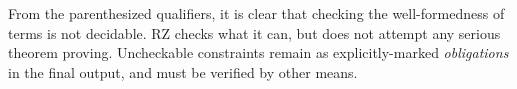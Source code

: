 From the parenthesized qualifiers, it is clear that checking the
well-formedness of terms is not decidable. RZ checks what it can, but does not
attempt any serious theorem proving. Uncheckable constraints remain as
explicitly-marked \emph{obligations} in the final output, and must be verified
by other means.






\newcommand{\ip}{p}
\newcommand{\ix}{x}
\newcommand{\is}{s}
\newcommand{\ie}{e}
\newcommand{\iP}{P}
\newcommand{\iS}{S}
\newcommand{\iprop}{\mathtt{prop}}
\newcommand{\itrue}{\mathtt{true}}
\newcommand{\ifalse}{\mathtt{false}}
\newcommand{\inot}[1]{\mathtt{not}\,#1}
\newcommand{\iimply}[2]{#1\,\mbox{\texttt{->}}\,#2}
\newcommand{\iiff}[2]{#1\,\mbox{\texttt{<->}}\,#2}
\newcommand{\iequal}[2]{#1\,\mathtt{=}\,#2}
\newcommand{\iands}[2]{#1\,\mathtt{/\backslash}\, #2}
\newcommand{\iors}[2]{#1\,\mathtt{\backslash/}\,#2}
\newcommand{\iforall}[3]{\texttt{forall}\,#1\,\texttt{:}\,#2\texttt{,}\ #3}
\newcommand{\iexists}[3]{\texttt{exists}\,#1\,\texttt{:}\,#2\texttt{,}\ #3}
\newcommand{\iunique}[3]{\texttt{unique}\,#1\,\texttt{:}\,#2\texttt{,}\ #3}
\newcommand{\ilambda}[3]{\texttt{lambda}\,#1\,\texttt{:}\,#2\texttt{,}\ #3}
\newcommand{\iapps}[3]{#1\ #2\,\cdots\,#3}

\newcommand{\ituples}[2]{\texttt{(}#1\texttt{,}\ldots\texttt{,}#2\texttt{)}}
\newcommand{\iproj}[2]{#1\texttt{.}#2}
\newcommand{\iconstrain}[2]{#1\,\texttt{:}\,#2}
\newcommand{\ithe}[3]{\texttt{the}\,#1\,\texttt{:}\,#2\texttt{,}\, #3}
\newcommand{\ilet}[3]{\texttt{let}\,#1\,\texttt{=}\,#2\,\texttt{in}\, #3}
\newcommand{\iquot}[2]{#1\,\texttt{\%}\,#2}
\newcommand{\iletquot}[4]{\texttt{let}\ #1\texttt{\%}\,#2\,\texttt{=}\,#3\ \texttt{in}\ #4}
\newcommand{\irz}[1]{\texttt{rz}\,#1}
\newcommand{\iletrz}[3]{\texttt{let}\ \texttt{rz}\,#1\,\texttt{=}\,#2\ \texttt{in}\ #3}

\newcommand{\iprods}[2]{#1\,\texttt{*}\cdots\texttt{*}\,#2}
\newcommand{\isums}[2]{#1\,\texttt{+}\cdots\texttt{+}\,#2}

